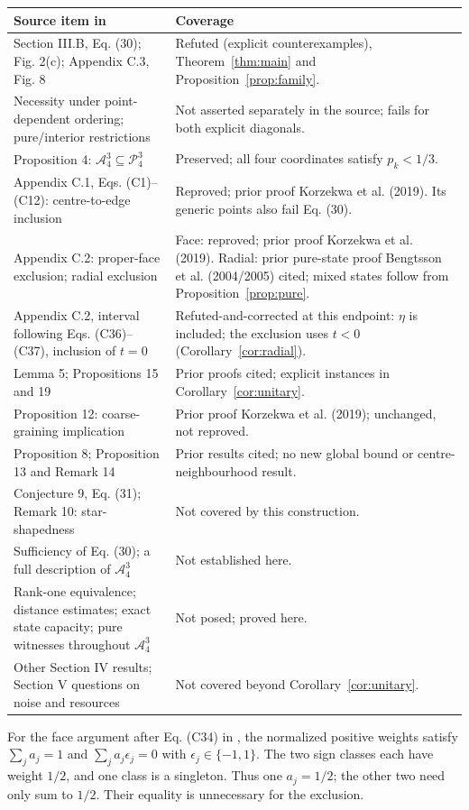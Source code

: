 \documentclass[11pt]{article}
\newcommand{\A}{\mathcal A}
\newcommand{\Pp}{\mathcal P}
\begin{document}
\begin{center}
\small
\begin{tabular}{@{}p{.48\linewidth}p{.46\linewidth}@{}}
\toprule
Source item in \cite{KCPZ} & Coverage\\
\midrule
Section III.B, Eq. (30); Fig. 2(c); Appendix C.3, Fig. 8
 & Refuted (explicit counterexamples), Theorem~\ref{thm:main} and
 Proposition~\ref{prop:family}.\\
Necessity under point-dependent ordering; pure/interior restrictions
 & Not asserted separately in the source; fails for both explicit diagonals.\\
Proposition 4: $\A_4^3\subseteq\Pp_4^3$
 & Preserved; all four coordinates satisfy $p_k<1/3$.\\
Appendix C.1, Eqs. (C1)--(C12): centre-to-edge inclusion
 & Reproved; prior proof Korzekwa et al. (2019).
 Its generic points also fail Eq. (30).\\
Appendix C.2: proper-face exclusion; radial exclusion
 & Face: reproved; prior proof Korzekwa et al. (2019).
 Radial: prior pure-state proof Bengtsson et al. (2004/2005) cited;
 mixed states follow from Proposition~\ref{prop:pure}.\\
Appendix C.2, interval following Eqs. (C36)--(C37), inclusion of $t=0$
 & Refuted-and-corrected at this endpoint: $\eta$ is included;
 the exclusion uses $t<0$ (Corollary~\ref{cor:radial}).\\
Lemma 5; Propositions 15 and 19
 & Prior proofs cited; explicit instances in Corollary~\ref{cor:unitary}.\\
Proposition 12: coarse-graining implication
 & Prior proof Korzekwa et al. (2019); unchanged, not reproved.\\
Proposition 8; Proposition 13 and Remark 14
 & Prior results cited; no new global bound or centre-neighbourhood result.\\
Conjecture 9, Eq. (31); Remark 10: star-shapedness
 & Not covered by this construction.\\
Sufficiency of Eq. (30); a full description of $\A_4^3$
 & Not established here.\\
Rank-one equivalence; distance estimates; exact state capacity;
 pure witnesses throughout $\A_4^3$
 & Not posed; proved here.\\
Other Section IV results; Section V questions on noise and resources
 & Not covered beyond Corollary~\ref{cor:unitary}.\\
\bottomrule
\end{tabular}
\end{center}
For the face argument after Eq. (C34) in \cite{KCPZ}, the normalized
positive weights satisfy $\sum_j a_j=1$ and $\sum_j a_j\epsilon_j=0$
with $\epsilon_j\in\{-1,1\}$. The two sign classes each have weight
$1/2$, and one class is a singleton. Thus one $a_j=1/2$; the other two
need only sum to $1/2$. Their equality is unnecessary for the exclusion.
\end{document}
